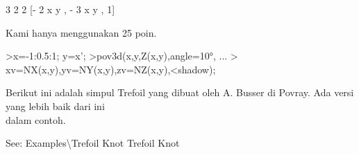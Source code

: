 \documentclass{article}
\begin{document}
\begin{eulernotebook}
\begin{euleroutput}
                                 3       2  2
                         [- 2 x y , - 3 x  y , 1]
  
\end{euleroutput}
\begin{eulercomment}
Kami hanya menggunakan 25 poin.
\end{eulercomment}
\begin{eulerprompt}
>x=-1:0.5:1; y=x';
>pov3d(x,y,Z(x,y),angle=10°, ...
>  xv=NX(x,y),yv=NY(x,y),zv=NZ(x,y),<shadow);
\end{eulerprompt}
\begin{eulercomment}
Berikut ini adalah simpul Trefoil yang dibuat oleh A. Busser di
Povray. Ada versi yang lebih baik dari ini\\
dalam contoh.

See: Examples\textbackslash{}Trefoil Knot \textbar{} Trefoil Knot


\end{eulercomment}
\end{eulernotebook}
\end{document}
